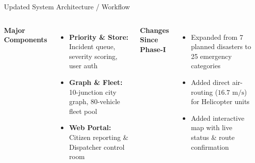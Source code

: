 \documentclass[aspectratio=169,11pt]{beamer}
\begin{document}
\begin{frame}{Updated System Architecture / Workflow}
\begin{center}
\end{center}
\vspace{3mm}
\footnotesize
\begin{columns}[T,totalwidth=\textwidth]
\textbf{\normalsize\color{GEUBlue}Major Components}
\begin{itemize}\itemsep2pt
\item \textbf{Priority \& Store:} Incident queue, severity scoring, user auth
\item \textbf{Graph \& Fleet:} 10-junction city graph, 80-vehicle fleet pool
\item \textbf{Web Portal:} Citizen reporting \& Dispatcher control room
\end{itemize}
\textbf{\normalsize\color{GEUBlue}Changes Since Phase-I}
\begin{itemize}\itemsep2pt
\item Expanded from 7 planned disasters to 25 emergency categories
\item Added direct air-routing ($16.7\text{ m/s}$) for Helicopter units
\item Added interactive map with live status \& route confirmation
\end{itemize}
\end{columns}
\end{frame}
\end{document}
